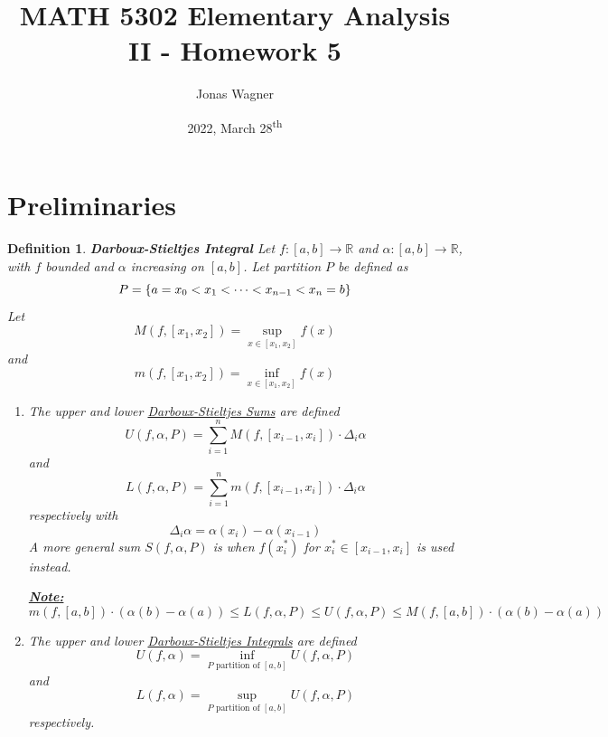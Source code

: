 \documentclass[]{article}
\title{MATH 5302 Elementary Analysis II - Homework 5}
\author{Jonas Wagner}
\date{2022, March 28\textsuperscript{th}}
\newcommand{\R}{\mathbb{R}}
\newtheorem{definition}{Definition}
\begin{document}
\maketitle


\section*{Preliminaries}
\begin{definition}
    \textbf{\emph{Darboux-Stieltjes Integral}}
    Let $f : [a,b] \to \R$ and $\alpha : [a,b] \to \R$, with $f$ bounded and $\alpha$ increasing on $[a,b]$.
    Let partition $P$ be defined as \[
        P = \qty{a = x_0 < x_1 < \cdots < x_{n-1} < x_n = b}
    \] Let \[
        M(f, [x_1, x_2]) = \sup_{x \in [x_1, x_2]} f(x)
    \] and \[
        m(f, [x_1, x_2]) = \inf_{x \in [x_1, x_2]} f(x)
    \]
    \begin{enumerate}
        \item The upper and lower \emph{\underline{Darboux-Stieltjes Sums}} are defined \[            
            U(f, \alpha, P) = \sum_{i=1}^{n} M(f, [x_{i-1}, x_i]) \cdot \Delta_i \alpha
        \] and \[
            L(f, \alpha, P) = \sum_{i=1}^{n} m(f, [x_{i-1}, x_i]) \cdot \Delta_i \alpha
        \] respectively with \[
            \Delta_i \alpha = \alpha(x_i) - \alpha(x_{i-1})
        \] A more general sum $S(f, \alpha, P)$ is when $f(x_i^*)$ for $x_i^* \in [x_{i-1}, x_{i}]$ is used instead.

        \emph{\textbf{\underline{Note:}}} \[
            m(f,[a,b]) \cdot (\alpha(b) - \alpha(a)) 
            \leq L(f, \alpha, P) 
            \leq U(f, \alpha, P)
            \leq M(f,[a,b]) \cdot (\alpha(b) - \alpha(a)) 
        \]
        \item The upper and lower \emph{\underline{Darboux-Stieltjes Integrals}} are defined \[            
            U(f, \alpha) = \inf_{P \text{ partition of } [a,b]} U(f, \alpha, P)
        \] and \[
            L(f, \alpha) = \sup_{P \text{ partition of } [a,b]} U(f, \alpha, P)
        \] respectively.


\end{enumerate}
\end{definition}
\end{document}
